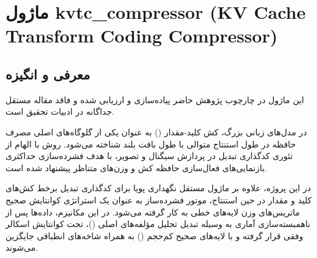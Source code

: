 \section{ماژول kvtc\_compressor (KV Cache Transform Coding Compressor)}
\label{sec:module_kvtc_compressor}

\subsection{معرفی و انگیزه}
این ماژول در چارچوب پژوهش حاضر پیاده‌سازی و ارزیابی شده و فاقد مقاله مستقل جداگانه در ادبیات تحقیق است.

در مدل‌های زبانی بزرگ، کش کلید-مقدار () به عنوان یکی از گلوگاه‌های اصلی مصرف حافظه در طول استنتاج متوالی با طول بافت بلند شناخته می‌شود. روش  با الهام از تئوری کدگذاری تبدیل در پردازش سیگنال و تصویر، با هدف فشرده‌سازی حداکثری بازنمایی‌های فعال‌سازی حافظه کش و وزن‌های متناظر پیشنهاد شده است.

در این پروژه، علاوه بر ماژول مستقل نگهداری پویا  برای کدگذاری تبدیل برخط کش‌های کلید و مقدار در حین استنتاج، موتور فشرده‌ساز  به عنوان یک استراتژی کوانتایش صحیح ماتریس‌های وزن لایه‌های خطی به کار گرفته می‌شود. در این مکانیزم، داده‌ها پس از ناهمبسته‌سازی آماری به وسیله تبدیل تحلیل مؤلفه‌های اصلی ()، تحت کوانتایش اسکالر وفقی قرار گرفته و با لایه‌های صحیح کم‌حجم () به همراه شاخه‌های انطباقی  جایگزین می‌شوند.


